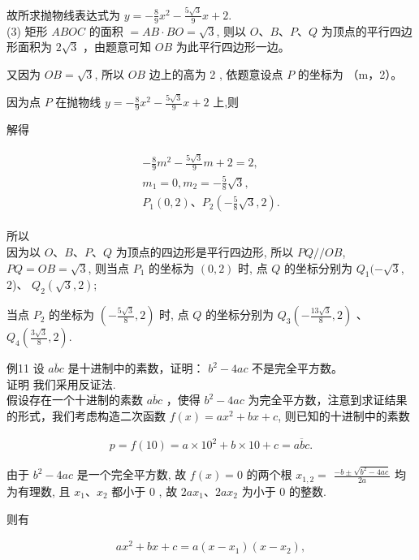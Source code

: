 \documentclass[10pt]{article}
\begin{document}
故所求抛物线表达式为 $y=-\frac{8}{9} x^{2}-\frac{5 \sqrt{3}}{9} x+2$.\\
(3) 矩形 $A B O C$ 的面积 $=A B \cdot B O=\sqrt{3}$, 则以 $O 、 B 、 P 、 Q$ 为顶点的平行四边形面积为 $2 \sqrt{3}$ ，由题意可知 $O B$ 为此平行四边形一边。

又因为 $O B=\sqrt{3}$, 所以 $O B$ 边上的高为 2 , 依题意设点 $P$ 的坐标为 （m，2）。

因为点 $P$ 在抛物线 $y=-\frac{8}{9} x^{2}-\frac{5 \sqrt{3}}{9} x+2$ 上,则

解得

\begin{align*}
\begin{gathered}
-\frac{8}{9} m^{2}-\frac{5 \sqrt{3}}{9} m+2=2, \\
m_{1}=0, m_{2}=-\frac{5}{8} \sqrt{3}, \\
P_{1}(0,2) 、 P_{2}\left(-\frac{5}{8} \sqrt{3}, 2\right) .
\end{gathered}
\end{align*}

所以\\
因为以 $O 、 B 、 P 、 Q$ 为顶点的四边形是平行四边形, 所以 $P Q / / O B$, $P Q=O B=\sqrt{3}$, 则当点 $P_{1}$ 的坐标为 $(0,2)$ 时, 点 $Q$ 的坐标分别为 $Q_{1}(-\sqrt{3}$, 2)、 $Q_{2}(\sqrt{3}, 2)$;

当点 $P_{2}$ 的坐标为 $\left(-\frac{5 \sqrt{3}}{8}, 2\right)$ 时, 点 $Q$ 的坐标分别为 $Q_{3}\left(-\frac{13 \sqrt{3}}{8}, 2\right)$ 、 $Q_{4}\left(\frac{3 \sqrt{3}}{8}, 2\right)$.

例11 设 $\overline{a b c}$ 是十进制中的素数，证明： $b^{2}-4 a c$ 不是完全平方数。\\
证明 我们采用反证法.\\
假设存在一个十进制的素数 $\overline{a b c}$ ，使得 $b^{2}-4 a c$ 为完全平方数，注意到求证结果的形式，我们考虑构造二次函数 $f(x)=a x^{2}+b x+c$, 则已知的十进制中的素数

\begin{align*}
p=f(10)=a \times 10^{2}+b \times 10+c=\overline{a b c} .
\end{align*}

由于 $b^{2}-4 a c$ 是一个完全平方数, 故 $f(x)=0$ 的两个根 $x_{1,2}=$ $\frac{-b \pm \sqrt{b^{2}-4 a c}}{2 a}$ 均为有理数, 且 $x_{1} 、 x_{2}$ 都小于 0 , 故 $2 a x_{1} 、 2 a x_{2}$ 为小于 0 的整数.

则有

\begin{align*}
a x^{2}+b x+c=a\left(x-x_{1}\right)\left(x-x_{2}\right),
\end{align*}
\end{document}
